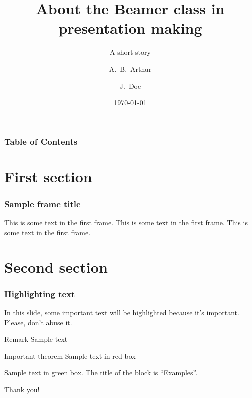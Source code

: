 \documentclass{beamer}
\title[About Beamer]
{About the Beamer class in presentation making}
\subtitle{A short story}
\author[Arthur, Doe] %
{A.~B.~Arthur\inst{1} \and J.~Doe\inst{2}}
\institute[NJU] %
{
\inst{1}%
Faculty of Physics\\
Very Famous University
\and
\inst{2}%
Faculty of Chemistry\\
Very Famous University
}
\date[ICLR 2023] %
{\today}
\begin{document}
\frame{\titlepage}

\begin{frame}
    \frametitle{Table of Contents}
    \tableofcontents
\end{frame}

\section{First section}

\begin{frame}
    \frametitle{Sample frame title}
    This is some text in the first frame. This is some text in the first frame. This is some text in the first frame.
\end{frame}

\section{Second section}

\begin{frame}
    \frametitle{Highlighting text}

    In this slide, some important text will be
    \alert{highlighted} because it's important.
    Please, don't abuse it.

    \begin{block}{Remark}
        Sample text
    \end{block}

    \begin{alertblock}{Important theorem}
        Sample text in red box
    \end{alertblock}

    \begin{examples}
        Sample text in green box. The title of the block is ``Examples''.
    \end{examples}
\end{frame}

\begin{frame}
\Huge{\centerline{Thank you!}}
\end{frame}
\end{document}
